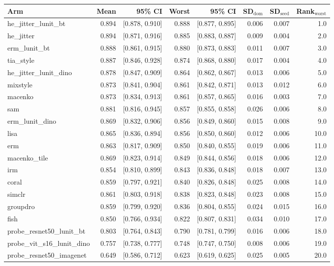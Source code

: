\begin{tabular}{lrrrrrrr}
\toprule
Arm & Mean & 95\% CI & Worst & 95\% CI & SD$_\text{dom}$ & SD$_\text{seed}$ & Rank$_\text{worst}$ \\
\midrule
he\_jitter\_lunit\_bt & 0.894 & [0.878, 0.910] & 0.888 & [0.877, 0.895] & 0.006 & 0.007 & 1.0 \\
he\_jitter & 0.894 & [0.871, 0.916] & 0.885 & [0.883, 0.887] & 0.009 & 0.004 & 2.0 \\
erm\_lunit\_bt & 0.888 & [0.861, 0.915] & 0.880 & [0.873, 0.883] & 0.011 & 0.007 & 3.0 \\
tia\_style & 0.887 & [0.846, 0.928] & 0.874 & [0.868, 0.880] & 0.017 & 0.004 & 4.0 \\
he\_jitter\_lunit\_dino & 0.878 & [0.847, 0.909] & 0.864 & [0.862, 0.867] & 0.013 & 0.006 & 5.0 \\
mixstyle & 0.873 & [0.841, 0.904] & 0.861 & [0.842, 0.871] & 0.013 & 0.012 & 6.0 \\
macenko & 0.873 & [0.834, 0.913] & 0.861 & [0.857, 0.865] & 0.016 & 0.003 & 7.0 \\
sam & 0.881 & [0.816, 0.945] & 0.857 & [0.855, 0.858] & 0.026 & 0.006 & 8.0 \\
erm\_lunit\_dino & 0.869 & [0.832, 0.906] & 0.856 & [0.849, 0.860] & 0.015 & 0.008 & 9.0 \\
lisa & 0.865 & [0.836, 0.894] & 0.856 & [0.850, 0.860] & 0.012 & 0.006 & 10.0 \\
erm & 0.863 & [0.817, 0.909] & 0.850 & [0.840, 0.855] & 0.019 & 0.006 & 11.0 \\
macenko\_tile & 0.869 & [0.823, 0.914] & 0.849 & [0.844, 0.856] & 0.018 & 0.006 & 12.0 \\
irm & 0.854 & [0.810, 0.899] & 0.843 & [0.836, 0.848] & 0.018 & 0.007 & 13.0 \\
coral & 0.859 & [0.797, 0.921] & 0.840 & [0.826, 0.848] & 0.025 & 0.008 & 14.0 \\
simclr & 0.861 & [0.803, 0.918] & 0.838 & [0.823, 0.848] & 0.023 & 0.008 & 15.0 \\
groupdro & 0.859 & [0.799, 0.920] & 0.836 & [0.804, 0.855] & 0.024 & 0.015 & 16.0 \\
fish & 0.850 & [0.766, 0.934] & 0.822 & [0.807, 0.831] & 0.034 & 0.010 & 17.0 \\
probe\_resnet50\_lunit\_bt & 0.803 & [0.764, 0.843] & 0.790 & [0.781, 0.799] & 0.016 & 0.006 & 18.0 \\
probe\_vit\_s16\_lunit\_dino & 0.757 & [0.738, 0.777] & 0.748 & [0.747, 0.750] & 0.008 & 0.006 & 19.0 \\
probe\_resnet50\_imagenet & 0.649 & [0.586, 0.712] & 0.623 & [0.619, 0.625] & 0.025 & 0.005 & 20.0 \\
\bottomrule
\end{tabular}
